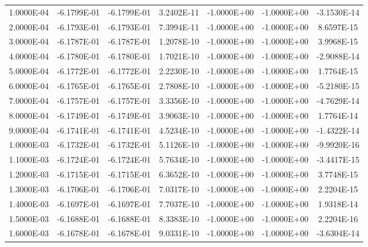 \documentclass[12pt,letterpaper,reqno]{article}
\numberwithin{equation}{section}
\begin{document}
{\begin{tabular}{|c|c|c|c|c|c|c|}
 1.0000E-04     & -6.1799E-01     & -6.1799E-01     &  3.2402E-11     & -1.0000E+00     & -1.0000E+00     & -3.1530E-14    \\ 
 2.0000E-04     & -6.1793E-01     & -6.1793E-01     &  7.3994E-11     & -1.0000E+00     & -1.0000E+00     &  8.6597E-15    \\ 
 3.0000E-04     & -6.1787E-01     & -6.1787E-01     &  1.2078E-10     & -1.0000E+00     & -1.0000E+00     &  3.9968E-15    \\ 
 4.0000E-04     & -6.1780E-01     & -6.1780E-01     &  1.7021E-10     & -1.0000E+00     & -1.0000E+00     & -2.9088E-14    \\ 
 5.0000E-04     & -6.1772E-01     & -6.1772E-01     &  2.2230E-10     & -1.0000E+00     & -1.0000E+00     &  1.7764E-15    \\ 
 6.0000E-04     & -6.1765E-01     & -6.1765E-01     &  2.7808E-10     & -1.0000E+00     & -1.0000E+00     & -5.2180E-15    \\ 
 7.0000E-04     & -6.1757E-01     & -6.1757E-01     &  3.3356E-10     & -1.0000E+00     & -1.0000E+00     & -4.7629E-14    \\ 
 8.0000E-04     & -6.1749E-01     & -6.1749E-01     &  3.9063E-10     & -1.0000E+00     & -1.0000E+00     &  1.7764E-14    \\ 
 9.0000E-04     & -6.1741E-01     & -6.1741E-01     &  4.5234E-10     & -1.0000E+00     & -1.0000E+00     & -1.4322E-14    \\ 
 1.0000E-03     & -6.1732E-01     & -6.1732E-01     &  5.1126E-10     & -1.0000E+00     & -1.0000E+00     & -9.9920E-16    \\ 
 1.1000E-03     & -6.1724E-01     & -6.1724E-01     &  5.7634E-10     & -1.0000E+00     & -1.0000E+00     & -3.4417E-15    \\ 
 1.2000E-03     & -6.1715E-01     & -6.1715E-01     &  6.3652E-10     & -1.0000E+00     & -1.0000E+00     &  3.7748E-15    \\ 
 1.3000E-03     & -6.1706E-01     & -6.1706E-01     &  7.0317E-10     & -1.0000E+00     & -1.0000E+00     &  2.2204E-15    \\ 
 1.4000E-03     & -6.1697E-01     & -6.1697E-01     &  7.7037E-10     & -1.0000E+00     & -1.0000E+00     &  1.9318E-14    \\ 
 1.5000E-03     & -6.1688E-01     & -6.1688E-01     &  8.3383E-10     & -1.0000E+00     & -1.0000E+00     &  2.2204E-16    \\ 
 1.6000E-03     & -6.1678E-01     & -6.1678E-01     &  9.0331E-10     & -1.0000E+00     & -1.0000E+00     & -3.6304E-14    \\ 

\end{tabular}}
\end{document}
